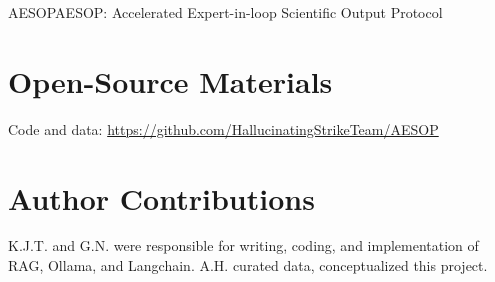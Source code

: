 \begin{teamsubmission}{AESOP}{AESOP: Accelerated Expert-in-loop Scientific Output Protocol}
\section*{Open-Source Materials}
Code and data: \url{https://github.com/HallucinatingStrikeTeam/AESOP}

\section*{Author Contributions}
K.J.T. and G.N. were responsible for writing, coding, and implementation of RAG, Ollama, and Langchain. A.H. curated data, conceptualized this project.

\end{teamsubmission}




